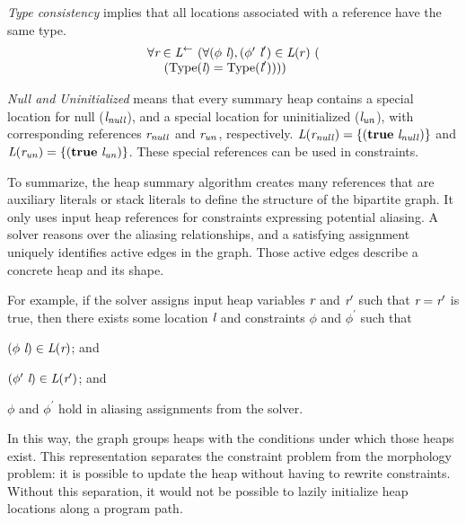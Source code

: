 \emph{Type consistency} implies that all locations associated with a reference have the same type.
\[
\begin{array}{l}
\forall \cfgnt{r} \in \cfgnt{L}^\leftarrow\ (\forall (\phi\ \cfgnt{l}),(\phi^\prime\ \cfgnt{l}^\prime) \in \cfgnt{L}(r)\ (\\
\ \ \ \ (\mathrm{Type}\lp\cfgnt{l}\rp = \mathrm{Type}\lp\cfgnt{l}^\prime\rp)))
\end{array}
\]

\emph{Null and Uninitialized} means that every summary heap contains 
a special location for null ($\emph{l}_\mathit{null}$), and a special
location for uninitialized
  ($\emph{l}_\mathit{un}$), with corresponding references
  $\emph{r}_\mathit{null}$ and
  $\emph{r}_\mathit{un}$, respectively. $\emph{L}(\emph{r}_\mathit{null}) =
  \{(\textbf{true}\ \emph{l}_\mathit{null})\}$ and
  $\emph{L}(\emph{r}_\mathit{un}) =
  \{(\textbf{true}\ \emph{l}_\mathit{un})\}$. These special references can be used in constraints.

To summarize, the heap summary algorithm creates
many references that are auxiliary literals or stack literals to
define the structure of the bipartite graph.  It only uses input heap
references for constraints expressing potential aliasing. A solver
reasons over the aliasing relationships, and a satisfying assignment
uniquely identifies active edges in the graph. Those active edges
describe a concrete heap and its shape.

For example, if the solver assigns input heap variables $\emph{r}$ and $\emph{r}^\prime$
such that $\emph{r} = \emph{r}^\prime$ is true, then there exists
some location $\emph{l}$ and constraints $\phi$ and $\phi^\prime$ such
that
\begin{compactitem}
\item $(\phi\ \emph{l}) \in \emph{L}(\emph{r})$; and
\item $(\phi^\prime\ \emph{l}) \in \emph{L}(\emph{r}^\prime)$; and
\item $\phi$ and $\phi^\prime$ hold in aliasing assignments from the solver.
\end{compactitem}
In this way, the graph groups heaps with the conditions under which
those heaps exist. This representation separates the constraint
problem from the morphology problem: it is possible to update the heap
without having to rewrite constraints. Without this separation, it
would not be possible to lazily initialize heap locations along a
program path.

